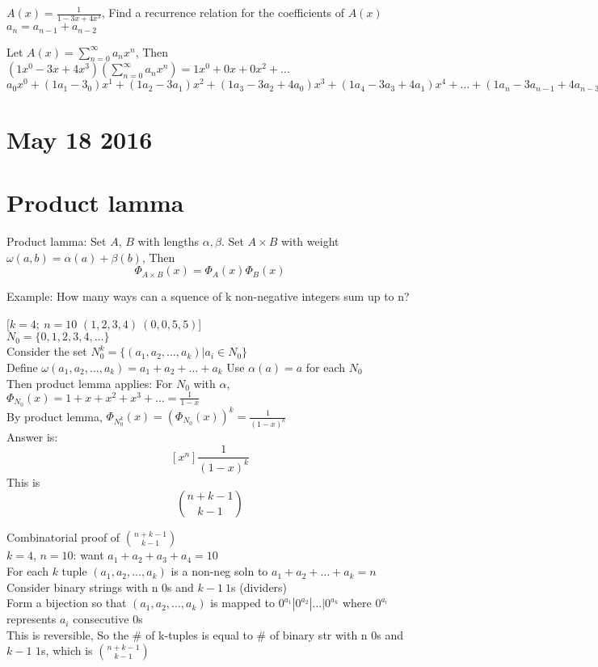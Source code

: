 \documentclass{article}
\begin{document}
$A(x)=\frac{1}{1-3x+4x^3}$, Find a recurrence relation for the coefficients of $A(x)$\\
$a_n=a_{n-1}+a_{n-2}$

Let $A(x)=\sum_{n=0}^\infty a_nx^n$, Then $(1x^0-3x+4x^3)(\sum_{n=0}^\infty a_nx^n)=1x^0+0x+0x^2+\hdots$\\
$a_0x^0+(1a_1-3_0)x^1+(1a_2-3a_1)x^2+(1a_3-3a_2+4a_0)x^3+(1a_4-3a_3+4a_1)x^4+\hdots+(1a_n-3a_{n-1}+4a_{n-3})x^n+\hdots$



\section*{May 18 2016}

\section*{Product lamma}
Product lamma: Set $A$, $B$ with lengths $\alpha ,\beta$. Set $A\times B$ with weight $\omega(a,b)=\alpha(a)+\beta(b)$, Then $$\Phi_{A\times B}(x)=\Phi_A(x)\Phi_B(x)$$

Example: How many ways can a squence of k non-negative integers sum up to n?

[$k=4;\ n=10$    $(1,2,3,4)\ (0,0,5,5)$]\\
$N_0=\{0,1,2,3,4,\hdots\}$\\
Consider the set $N_0^k=\{(a_1,a_2,\hdots,a_k)|a_i \in N_0\}$\\
Define $\omega(a_1,a_2,\hdots,a_k)=a_1+a_2+\hdots+a_k$    Use $\alpha(a)=a$ for each $N_0$\\
Then product lemma applies: For $N_0$ with $\alpha$, $\Phi_{N_0}(x)=1+x+x^2+x^3+\hdots=\frac{1}{1-x}$\\
By product lemma, $\Phi_{N_0^k}(x)=(\Phi_{N_0}(x))^k=\frac{1}{(1-x)^k}$\\
Answer is: $$[x^n]\frac{1}{(1-x)^k}$$ This is $$\binom{n+k-1}{k-1}$$

Combinatorial proof of $\binom{n+k-1}{k-1}$\\
$k=4$, $n=10$: want $a_1+a_2+a_3+a_4=10$ \\
For each $k$ tuple $(a_1,a_2,\hdots ,a_k)$ is a non-neg soln to $a_1+a_2+\hdots +a_k=n$ \\
Consider binary strings with n $0$s and $k-1\ 1$s (dividers) \\
Form a bijection so that $(a_1,a_2,\hdots,a_k)$ is mapped to $0^{a_1}|0^{a_2}|\hdots |0^{a_k}$ where $0^{a_i}$ represents $a_i$ consecutive $0$s\\ This is reversible, So the \# of k-tuples is equal to \# of binary str with n $0$s and $k-1$ $1$s, which is $\binom{n+k-1}{k-1}$
\end{document}
